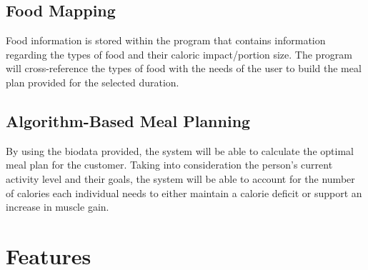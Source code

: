 \documentclass{article}
\begin{document}
\subsection{Food Mapping}
Food information is stored within the program that contains information regarding the types of food and their caloric impact/portion size. The program will cross-reference the types of food with the needs of the user to build the meal plan provided for the selected duration.

\subsection{Algorithm-Based Meal Planning}
By using the biodata provided, the system will be able to calculate the optimal meal plan for the customer. Taking into consideration the person’s current activity level and their goals, the system will be able to account for the number of calories each individual needs to either maintain a calorie deficit or support an increase in muscle gain.

\section{Features}
\end{document}
